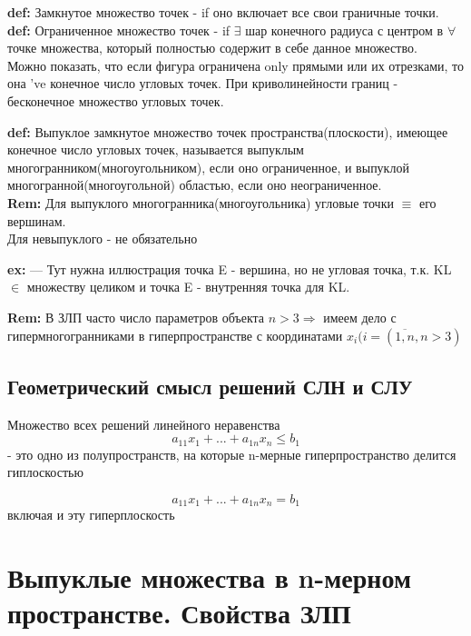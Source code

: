 \textbf{def:} Замкнутое множество точек - if оно включает все свои граничные точки. \\

\textbf{def:} Ограниченное множество точек - if $\exists$ шар конечного радиуса с центром в $\forall$ точке множества, который полностью содержит в себе данное множество.  \\

Можно показать, что если фигура ограничена only прямыми или их отрезками, то она 've конечное число угловых точек. При криволинейности границ - бесконечное множество угловых точек.

\textbf{def:} Выпуклое замкнутое множество точек пространства(плоскости), имеющее конечное число угловых точек, называется выпуклым многогранником(многоугольником), если оно ограниченное, и выпуклой многогранной(многоугольной) областью, если оно неограниченное. \\



\textbf{Rem:} Для выпуклого многогранника(многоугольника) угловые точки $\equiv$ его вершинам. \\
Для невыпуклого - не обязательно

\textbf{ex:} --- Тут нужна иллюстрация точка E - вершина, но не угловая точка, т.к. KL $\in$ множеству целиком и точка E - внутренняя точка для KL.

\textbf{Rem:} В ЗЛП часто число параметров объекта $n > 3 \Rightarrow$ имеем дело с гипермногогранниками в гиперпространстве с координатами $x_i (i = (\overline{1,n}, n > 3)$

\subsection{Геометрический смысл решений СЛН и СЛУ}

\begin{theorem}
Множество всех решений линейного неравенства 
    \begin{equation*}
    a_{11} x_1 + ... + a_{1n}x_n \leq b_1
    \end{equation*} - это одно из полупространств, на которые n-мерные гиперпространство делится гиплоскостью
    
    \begin{equation*}
    a_{11} x_1 + ... + a_{1n}x_n = b_1
    \end{equation*} включая и эту гиперплоскость   
\end{theorem}

\section{Выпуклые множества в n-мерном пространстве. Свойства ЗЛП}
